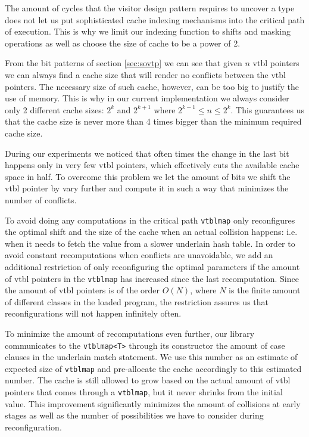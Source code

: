 \documentclass[preprint]{sigplanconf}
\makeatletter
\DeclareRobustCommand{\code}[1]{{\lstinline[breaklines=false,escapechar=@]{#1}}}
\makeatother
\begin{document}
The amount of cycles that the visitor design pattern requires to uncover a type 
does not let us put sophisticated cache indexing mechanisms into the critical 
path of execution. This is why we limit our indexing function to shifts and 
masking operations as well as choose the size of cache to be a power of 2.

From the bit patterns of section \textsection\ref{sec:sovtp} we can see that 
given $n$ vtbl pointers we can always find a cache size that will render no 
conflicts between the vtbl pointers. The necessary size of such cache, however, 
can be too big to justify the use of memory. This is why in our current 
implementation we always consider only 2 different cache sizes: $2^k$ and 
$2^{k+1}$ where $2^{k-1} \le n \leq 2^k$. This guarantees us that the cache size 
is never more than 4 times bigger than the minimum required cache size.

During our experiments we noticed that often times the change in the last bit 
happens only in very few vtbl pointers, which effectively cuts the available 
cache space in half. To overcome this problem we let the amount of bits we 
shift the vtbl pointer by vary further and compute it in such a way that 
minimizes the number of conflicts.

To avoid doing any computations in the critical path \code{vtblmap} only 
reconfigures the optimal shift and the size of the cache when an actual collision 
happens: i.e. when it needs to fetch the value from a slower underlain hash 
table. In order to avoid constant recomputations when conflicts are unavoidable, 
we add an additional restriction of only reconfiguring the optimal parameters if 
the amount of vtbl pointers in the \code{vtblmap} has increased since the last 
recomputation. Since the amount of vtbl pointers is of the order $O(N)$, where 
$N$ is the finite amount of different classes in the loaded program, the 
restriction assures us that reconfigurations will not happen infinitely often.

To minimize the amount of recomputations even further, our library communicates 
to the \code{vtblmap<T>} through its constructor the amount of case clauses in 
the underlain match statement. We use this number as an estimate of expected 
size of \code{vtblmap} and pre-allocate the cache accordingly to this estimated 
number. The cache is still allowed to grow based on the actual amount of vtbl 
pointers that comes through a \code{vtblmap}, but it never shrinks from the 
initial value. This improvement significantly minimizes the amount of collisions 
at early stages as well as the number of possibilities we have to consider 
during reconfiguration.
\end{document}
